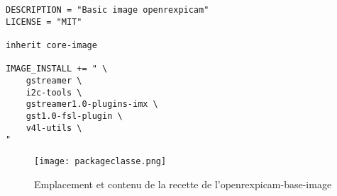 \begin{lstlisting}
DESCRIPTION = "Basic image openrexpicam"
LICENSE = "MIT"

inherit core-image

IMAGE_INSTALL += " \
    gstreamer \
    i2c-tools \
    gstreamer1.0-plugins-imx \
    gst1.0-fsl-plugin \
    v4l-utils \
"
\end{lstlisting}

\begin{figure}[th]
    \centering
    \texttt{[image: packageclasse.png]}
    \decoRule
    \caption{Emplacement et contenu de la recette de l'openrexpicam-base-image}
    \label{fig:arbor}
\end{figure}
